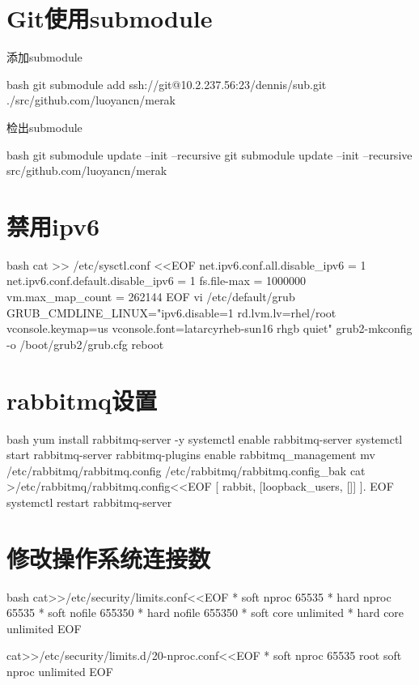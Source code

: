 \section{Git使用submodule}
添加submodule
\begin{code-block}{bash}
git submodule add ssh://git@10.2.237.56:23/dennis/sub.git ./src/github.com/luoyancn/merak
\end{code-block}
检出submodule
\begin{code-block}{bash}
git submodule update --init --recursive
git submodule update --init --recursive src/github.com/luoyancn/merak
\end{code-block}

\section{禁用ipv6}
\begin{code-block}{bash}
cat >> /etc/sysctl.conf <<EOF
net.ipv6.conf.all.disable_ipv6 = 1
net.ipv6.conf.default.disable_ipv6 = 1
fs.file-max = 1000000
vm.max_map_count = 262144
EOF
vi /etc/default/grub
GRUB_CMDLINE_LINUX="ipv6.disable=1 rd.lvm.lv=rhel/root vconsole.keymap=us vconsole.font=latarcyrheb-sun16 rhgb quiet"
grub2-mkconfig -o /boot/grub2/grub.cfg
reboot
\end{code-block}

\section{rabbitmq设置}
\begin{code-block}{bash}
yum install rabbitmq-server -y
systemctl enable rabbitmq-server
systemctl start rabbitmq-server
rabbitmq-plugins enable rabbitmq_management
mv /etc/rabbitmq/rabbitmq.config /etc/rabbitmq/rabbitmq.config_bak
cat >/etc/rabbitmq/rabbitmq.config<<EOF
[
{rabbit, [{loopback_users, []}]}
].
EOF
systemctl restart rabbitmq-server
\end{code-block}

\section{修改操作系统连接数}
\begin{code-block}{bash}
cat>>/etc/security/limits.conf<<EOF
*               soft    nproc           65535
*               hard    nproc           65535
*               soft    nofile          655350
*               hard    nofile          655350
*               soft    core            unlimited
*               hard    core            unlimited
EOF

cat>>/etc/security/limits.d/20-nproc.conf<<EOF
*          soft    nproc     65535
root       soft    nproc     unlimited
EOF
\end{code-block}

